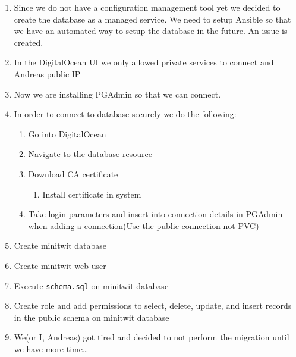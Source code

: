 \begin{enumerate}
    \item Since we do not have a configuration management tool yet we decided to create the database as a managed service. We need to setup Ansible so that we have an automated way to setup the database in the future. An issue is created.
    \item In the DigitalOcean UI we only allowed private services to connect and Andreas public IP
    \item Now we are installing PGAdmin so that we can connect.
    \item In order to connect to database securely we do the following:

    \begin{enumerate}
        \item Go into DigitalOcean
        \item Navigate to the database resource
        \item Download CA certificate
        \begin{enumerate}
            \item Install certificate in system
        \end{enumerate}

        \item Take login parameters and insert into connection details in PGAdmin when adding a connection(Use the public connection not PVC)
    \end{enumerate}
    \item Create minitwit database
    \item Create minitwit-web user
    \item Execute \texttt{schema.sql} on minitwit database
    \item Create role and add permissions to select, delete, update, and insert records in the public schema on minitwit database

    \item We(or I, Andreas) got tired and decided to not perform the migration until we have more time\ldots{}
\end{enumerate}

